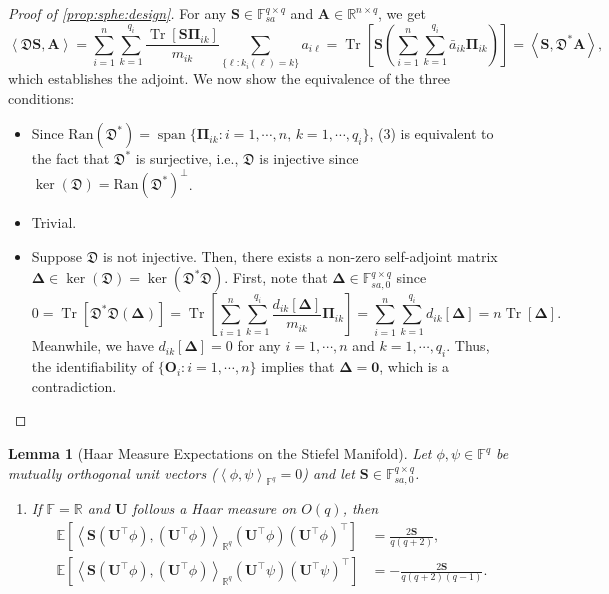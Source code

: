 \documentclass[noinfoline]{imsart}\setcounter{tocdepth}{2}
\renewcommand{\b}[1]{\mathbb{#1}} %
\newcommand{\m}[1]{\mathbf{#1}} %
\newcommand{\f}[1]{\mathfrak{#1}} %
\newcommand{\mb}[1]{\boldsymbol{#1}} %
\newcommand{\tr}[1]{\operatorname{Tr}\left[#1\right]}
\newcommand{\innpr}[2]{{\left\langle {#1},{#2}\right\rangle}} %
\DeclareMathOperator*{\spann}{span}
\theoremstyle{plain}
\newtheorem{lemma}[theorem]{Lemma}
\begin{document}
\begin{appendix}
\begin{proof}[Proof of \cref{prop:sphe:design}]
For any $\m{S} \in \b{F}_{sa}^{q \times q}$ and $\m{A} \in \b{R}^{n \times q}$, we get
\begin{equation*}
    \innpr{\f{D} \m{S}}{\m{A}} = \sum_{i=1}^{n} \sum_{k=1}^{q_{i}} \frac{\tr{\m{S} \m{\Pi}_{ik}}}{m_{ik}} \sum_{\{\ell : k_{i}(\ell) = k\}} a_{i\ell} = \tr{\m{S} \left( \sum_{i=1}^{n} \sum_{k=1}^{q_{i}} \bar{a}_{ik} \m{\Pi}_{ik} \right)} = \innpr{\m{S}}{\f{D}^{*} \m{A}}, 
\end{equation*}
which establishes the adjoint.
We now show the equivalence of the three conditions:
\begin{itemize}
\item [$(2 \Leftrightarrow 3)$] Since $\text{Ran}(\f{D}^{*}) = \spann \{\m{\Pi}_{ik} : i = 1, \cdots, n, \, k = 1, \cdots, q_{i} \}$, (3) is equivalent to the fact that $\f{D}^{*}$ is surjective, i.e., $\f{D}$ is injective since $\ker(\f{D}) = \text{Ran}(\f{D}^{*})^{\perp}$.
\item [$(3 \Rightarrow 1)$] Trivial.
\item [$(1 \Rightarrow 3)$] Suppose $\f{D}$ is not injective. Then, there exists a non-zero self-adjoint matrix $\mb{\Delta} \in \ker(\f{D}) = \ker(\f{D}^{*} \f{D})$. First, note that $\mb{\Delta} \in \b{F}_{sa, 0}^{q \times q}$  since 
\begin{equation*}
    0 = \tr{\f{D}^{*} \f{D}(\mb{\Delta})} = \tr{\sum_{i=1}^{n} \sum_{k=1}^{q_{i}} \frac{d_{ik}[\mb{\Delta}]}{m_{ik}} \m{\Pi}_{ik}} = \sum_{i=1}^{n} \sum_{k=1}^{q_{i}} d_{ik}[\mb{\Delta}] = n \tr{\mb{\Delta}}.
\end{equation*}
Meanwhile, we have $d_{ik}[\mb{\Delta}] = 0$ for any $i = 1, \cdots, n$ and $k = 1, \cdots, q_{i}$. Thus, the identifiability of $\{\m{O}_{i}: i = 1, \cdots, n\}$ implies that $\mb{\Delta} = \m{0}$, which is a contradiction.
\end{itemize}
\end{proof}

\begin{lemma}[Haar Measure Expectations on the Stiefel Manifold]\label{lem:haar:expec} 
Let $\phi, \psi \in \b{F}^{q}$ be mutually orthogonal unit vectors ($\innpr{\phi}{\psi}_{\b{F}^{q}}=0$) and let $\m{S} \in \b{F}_{sa, 0}^{q \times q}$.
\begin{enumerate}
\item If $\b{F} = \b{R}$ and $\m{U}$ follows a Haar measure on $O(q)$, then
\begin{align*}
    \b{E}\left[\innpr{\m{S} (\m{U}^{\top} \phi)}{(\m{U}^{\top} \phi)}_{\b{R}^{q}} (\m{U}^{\top} \phi) (\m{U}^{\top} \phi)^{\top}\right] &= \frac{2 \m{S}}{q(q+2)}, \\
    \b{E}\left[\innpr{\m{S} (\m{U}^{\top} \phi)}{(\m{U}^{\top} \phi)}_{\b{R}^{q}} (\m{U}^{\top} \psi) (\m{U}^{\top} \psi)^{\top}\right] &= - \frac{2 \m{S}}{q(q+2)(q-1)}.
\end{align*}


\end{enumerate}
\end{lemma}
\end{appendix}
\end{document}
